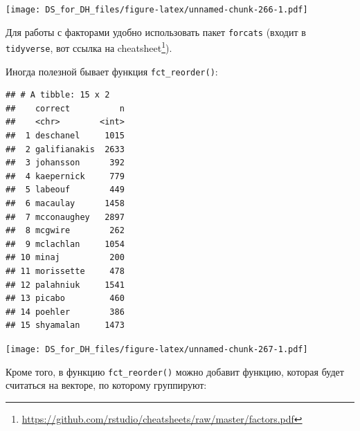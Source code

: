 \documentclass[
]{book}
\newenvironment{Shaded}{\begin{snugshade}}{\end{snugshade}}
\newcommand{\DataTypeTok}[1]{\textcolor[rgb]{0.13,0.29,0.53}{#1}}
\newcommand{\KeywordTok}[1]{\textcolor[rgb]{0.13,0.29,0.53}{\textbf{#1}}}
\newcommand{\NormalTok}[1]{#1}
\newcommand{\OperatorTok}[1]{\textcolor[rgb]{0.81,0.36,0.00}{\textbf{#1}}}
\newcommand{\StringTok}[1]{\textcolor[rgb]{0.31,0.60,0.02}{#1}}
\renewcommand{\href}[2]{#2\footnote{\url{#1}}}
\begin{document}
\texttt{[image: DS\_for\_DH\_files/figure-latex/unnamed-chunk-266-1.pdf]}

Для работы с факторами удобно использовать пакет \texttt{forcats} (входит в \texttt{tidyverse}, вот \href{https://github.com/rstudio/cheatsheets/raw/master/factors.pdf}{ссылка на cheatsheet}).

Иногда полезной бывает функция \texttt{fct\_reorder()}:

\begin{Shaded}
\end{Shaded}

\begin{verbatim}
## # A tibble: 15 x 2
##    correct          n
##    <chr>        <int>
##  1 deschanel     1015
##  2 galifianakis  2633
##  3 johansson      392
##  4 kaepernick     779
##  5 labeouf        449
##  6 macaulay      1458
##  7 mcconaughey   2897
##  8 mcgwire        262
##  9 mclachlan     1054
## 10 minaj          200
## 11 morissette     478
## 12 palahniuk     1541
## 13 picabo         460
## 14 poehler        386
## 15 shyamalan     1473
\end{verbatim}

\begin{Shaded}
\end{Shaded}

\texttt{[image: DS\_for\_DH\_files/figure-latex/unnamed-chunk-267-1.pdf]}

Кроме того, в функцию \texttt{fct\_reorder()} можно добавит функцию, которая будет считаться на векторе, по которому группируют:

\begin{Shaded}
\end{Shaded}
\end{document}
